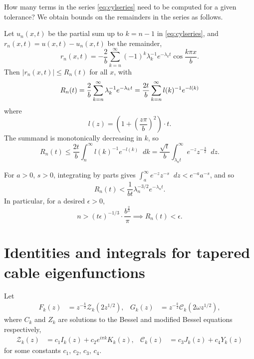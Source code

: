 \documentclass[parskip=half]{scrartcl}
\newcommand{\Int}[2]{\int_{#1}^{#2}\!}
\newcommand{\D}{\mathop{}\!d}
\newcommand{\cZ}{\mathcal{Z}}
\newcommand{\cC}{\mathcal{C}}
\theoremstyle{nonumberplain}
\begin{document}
How many terms in the series \eqref{eq:cylseries} need to be computed for a given tolerance?
We obtain bounds on the remainders in the series as follows.

Let $u_n(x,t)$ be the partial sum up to $k=n-1$ in \eqref{eq:cylseries}, and $r_n(x,t) = u(x,t) - u_n(x,t)$
be the remainder,
\begin{equation}
    r_n(x,t) = -\frac{2}{b}\sum_{k=n}^{\infty} (-1)^k\lambda_k^{-1}e^{-\lambda_k t}\cos\frac{k\pi x}{b}.
\end{equation}
Then $|r_n(x,t)|\leq R_n(t)$ for all $x$, with
\begin{equation}
    R_n(t) = \frac{2}{b}\sum_{k=n}^{\infty} \lambda_k^{-1}e^{-\lambda_k t}\\
    = \frac{2t}{b}\sum_{k=n}^{\infty} l(k)^{-1}e^{-l(k)}\\
\end{equation}
where
\[
    l(z) = \left(1+\left(\frac{z\pi}{b}\right)^2\right)\cdot t.
\]
The summand is monotonically decreasing in $k$, so
\begin{equation}
    \label{eq:rnigamma}
    R_n(t)
    \leq \frac{2t}{b}\Int{n}{\infty} l(k)^{-1}e^{-l(k)}\D k
    = \frac{\sqrt{t}}{b} \Int{\lambda_n t}{\infty} e^{-z}z^{-\frac{3}{2}} \D z.
\end{equation}

For $a>0$, $s>0$, integrating by parts gives
$\displaystyle \Int{a}{\infty} e^{-z}z^{-s}\D z < e^{-a}a^{-s}$,
and so
\begin{equation}
    R_n(t) < \frac{1}{b t}\lambda_n^{-3/2}e^{-\lambda_n t}.
\end{equation}
In particular, for a desired $\epsilon>0$,
\begin{equation}
    n > (t \epsilon)^{-1/3}\cdot\frac{b^\frac{2}{3}}{\pi}
    \implies
    R_n(t) < \epsilon.
\end{equation}

\section{Identities and integrals for tapered cable eigenfunctions}
\label{ap:conid}

\newcommand{\Fp}{\smash{F^{\mathrlap{\prime}}}\mkern-2.0mu}
\newcommand{\Gp}{\smash{G^{\mathrlap{\prime}}}\mkern-2.0mu}

Let
\begin{equation}
    \begin{aligned}
        F_k(z) &= z^{-\frac{k}{2}}\cZ_k(2z^{1/2}),&
        G_k(z) &= z^{-\frac{k}{2}}\cC_k(2\omega z^{1/2}),
    \end{aligned}
\end{equation}
where $C_k$ and $Z_k$ are solutions to the Bessel and modified Bessel equations
respectively,
\begin{equation}
    \begin{aligned}
        \cZ_k(z) &= c_1 I_k(z) + c_2 e^{i\pi k} K_k(z),&
        \cC_k(z) &= c_3 J_k(z) + c_4 Y_k(z)
    \end{aligned}
\end{equation}
for some constants $c_1$, $c_2$, $c_3$, $c_4$.
\end{document}
